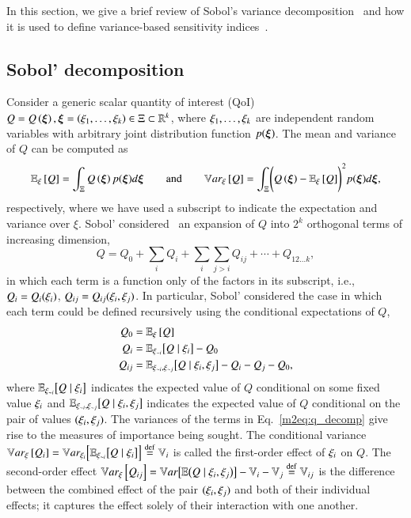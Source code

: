 In this section, we give a brief review of Sobol's variance decomposition~\cite{sobol-1993} and how it is used to define variance-based sensitivity indices~\cite{sobol-1993, homma-saltelli-1996}.

\subsection{Sobol' decomposition}
Consider a generic scalar quantity of interest (QoI) $Q = Q\left( \bm{\xi} \right), \bm{\xi} = \left( \xi_1,\ldots,\xi_k \right) \in \Xi \subset \mathbb{R}^k$, where $\xi_1,\ldots,\xi_k$ are independent random variables with arbitrary joint distribution function $p(\bm{\xi})$. 
The mean and variance of $Q$ can be computed as
\begin{equation}
    \mathbb{E}_\xi\left[Q\right] = \int_{\Xi} Q\left( \bm{\xi} \right) p(\bm{\xi}) d\bm{\xi} \qquad \text{and} \qquad \mathbb{V}ar_{\xi}\left[Q\right] = \int_{\Xi} \Biggl( Q\left( \bm{\xi} \right) - \mathbb{E}_\xi\left[Q\right] \Biggr)^2 p(\bm{\xi}) d\bm{\xi} ,
\end{equation}
respectively, where we have used a subscript to indicate the expectation and variance over $\xi$. 
Sobol' considered~\cite{sobol-1993} an expansion of $Q$ into $2^k$ orthogonal terms of increasing dimension, 
\begin{equation} \label{m2eq:q_decomp}
    Q = Q_0 + \sum_i Q_i + \sum_i \sum_{j > i} Q_{ij} + \cdots + Q_{12 \ldots k} ,
\end{equation}
in which each term is a function only of the factors in its subscript, i.e., $Q_i = Q_i(\xi_{i})$, $Q_{ij} = Q_{ij}(\xi_{i}, \xi_{j})$.
In particular, Sobol' considered the case in which each term could be defined recursively using the conditional expectations of $Q$,
\begin{align}
    Q_0 &= \mathbb{E}_\xi\left[Q\right] \\
    Q_i &= \mathbb{E}_{\xi_{\sim i}} \bigl[ Q \mid \xi_{i} \bigr] - Q_0 \\
    Q_{ij} &= \mathbb{E}_{\xi_{\sim i},\xi_{\sim j}} \bigl[ Q \mid \xi_{i}, \xi_{j} \bigr] - Q_i - Q_j - Q_0 ,
\end{align}
where $\mathbb{E}_{\xi_{\sim i}} \bigl[ Q \mid \xi_{i} \bigr]$ indicates the expected value of $Q$ conditional on some fixed value $\xi_{i}$ and $\mathbb{E}_{\xi_{\sim i},\xi_{\sim j}} \bigl[ Q \mid \xi_{i}, \xi_{j} \bigr]$ indicates the expected value of $Q$ conditional on the pair of values $(\xi_{i}, \xi_{j})$. 
The variances of the terms in Eq.~\eqref{m2eq:q_decomp} give rise to the measures of importance being sought. 
The conditional variance $\mathbb{V}ar_{\xi}\left[Q_i\right] = \mathbb{V}ar_{\xi_{i}} \Bigl[ \mathbb{E}_{\xi_{\sim i}}\bigl[ Q \mid \xi_{i} \bigr] \Bigr] \overset{\operatorname{def}}{=} \mathbb{V}_{i}$ is called the first-order effect of $\xi_{i}$ on $Q$.
The second-order effect $\mathbb{V}ar_{\xi}\left[Q_{ij}\right] = \mathbb{V}ar\bigl[ \mathbb{E}\bigl(Q \mid \xi_{i}, \xi_{j}\bigr) \bigr] - \mathbb{V}_{i} - \mathbb{V}_{j} \overset{\operatorname{def}}{=} \mathbb{V}_{ij}$ is the difference between the combined effect of the pair $(\xi_{i},\xi_{j})$ and both of their individual effects; it captures the effect solely of their interaction with one another.
